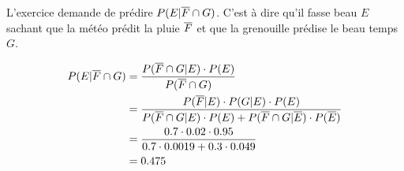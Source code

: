 \begin{exo}
 \begin{flushleft}
 	L'exercice demande de prédire $P(E | \overline{F} \cap G)$. C'est à dire qu'il fasse beau $E$ sachant que la météo prédit la pluie $\overline{F}$ et que la grenouille prédise le beau temps $G$.
  \end{flushleft}
  \begin{align*}
  	P(E | \overline{F} \cap G) &= \dfrac{P(\overline{F} \cap G |E)\cdot P(E)}{P(\overline{F} \cap G)}
  	\\&= \dfrac{P(\overline{F}|E)\cdot P(G|E)\cdot P(E)}{P(\overline{F} \cap G |E)\cdot P(E)+ P(\overline{F} \cap G |\overline{E})\cdot P(\overline{E})}
  	\\ &= \dfrac{0.7\cdot 0.02 \cdot 0.95}{0.7 \cdot 0.0019 + 0.3 \cdot 0.049}
  	\\ &=0.475
  \end{align*}
\end{exo}

